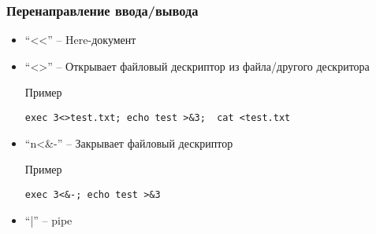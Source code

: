 \begin{frame}[fragile]
	\frametitle{Перенаправление ввода/вывода}

	\begin{itemize}

		\item ``<<'' -- Here-документ

		\item ``<>'' -- Открывает файловый дескриптор из файла/другого дескритора
			\begin{block}{Пример}
				\begin{lstlisting}
exec 3<>test.txt; echo test >&3;  cat <test.txt
				\end{lstlisting}
			\end{block}
			
		\item ``n<\&-'' -- Закрывает файловый дескриптор
			\begin{block}{Пример}
				\begin{lstlisting}
exec 3<&-; echo test >&3
				\end{lstlisting}
			\end{block}
			
		\item ``|'' -- pipe
	\end{itemize}

\end{frame}


